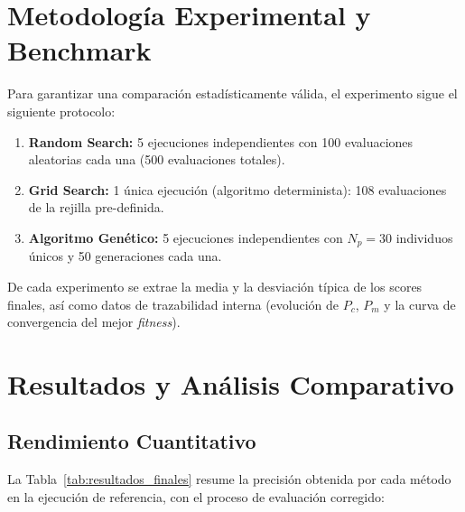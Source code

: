 \documentclass[12pt, a4paper]{article}
\begin{document}
\section{Metodología Experimental y Benchmark}

Para garantizar una comparación estadísticamente válida, el experimento sigue el
siguiente protocolo:

\begin{enumerate}[itemsep=0.3em]
  \item \textbf{Random Search:} 5 ejecuciones independientes con 100 evaluaciones
        aleatorias cada una (500 evaluaciones totales).
  \item \textbf{Grid Search:} 1 única ejecución (algoritmo determinista): 108
        evaluaciones de la rejilla pre-definida.
  \item \textbf{Algoritmo Genético:} 5 ejecuciones independientes con $N_p = 30$
        individuos únicos y 50 generaciones cada una.
\end{enumerate}

De cada experimento se extrae la media y la desviación típica de los scores finales, así
como datos de trazabilidad interna (evolución de $P_c$, $P_m$ y la curva de convergencia
del mejor \textit{fitness}).

\section{Resultados y Análisis Comparativo}

\subsection{Rendimiento Cuantitativo}

La Tabla~\ref{tab:resultados_finales} resume la precisión obtenida por cada método en la
ejecución de referencia, con el proceso de evaluación corregido:

\renewcommand{\arraystretch}{1.3}
\begin{table}[H]
  \centering
  \caption{Comparativa de precisión final (5-Fold Stratified CV Mean Accuracy)}
  \label{tab:resultados_finales}
\end{table}
\renewcommand{\arraystretch}{1}
\end{document}
